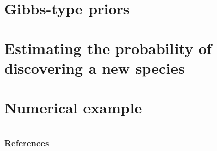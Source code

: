 \documentclass[11pt, handout]{beamer}
\begin{document}
\section{Gibbs-type priors}

\section{Estimating the probability of discovering a new species}

\section{Numerical example}

\section*{}
\begin{frame}[allowframebreaks] %
\frametitle{References}
\scriptsize{}

\end{frame}
 
\end{document}

